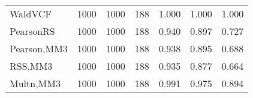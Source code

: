 \documentclass[
]{article}
\begin{document}
\begin{table}[H]
{\begin{tabular}[t]{lrrrrrr}
\hspace{1em}WaldVCF & 1000 & 1000 & 188 & 1.000 & 1.000 & 1.000\\
\hspace{1em}PearsonRS & 1000 & 1000 & 188 & 0.940 & 0.897 & 0.727\\
\hspace{1em}Pearson,MM3 & 1000 & 1000 & 188 & 0.938 & 0.895 & 0.688\\
\hspace{1em}RSS,MM3 & 1000 & 1000 & 188 & 0.935 & 0.877 & 0.664\\
\hspace{1em}Multn,MM3 & 1000 & 1000 & 188 & 0.991 & 0.975 & 0.894\\
\bottomrule
\end{tabular}}
\endgroup{}
\end{table}
\end{document}
